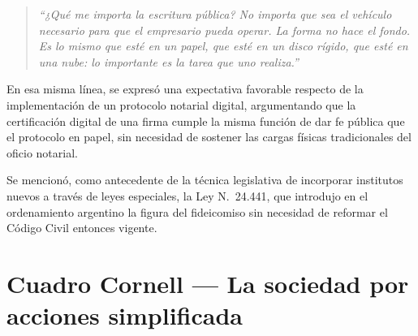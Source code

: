 \documentclass[12pt,oneside]{book}
\begin{document}
\begin{quote}
\textit{``¿Qué me importa la escritura pública? No importa que sea el vehículo necesario para que el empresario pueda operar. La forma no hace el fondo. Es lo mismo que esté en un papel, que esté en un disco rígido, que esté en una nube: lo importante es la tarea que uno realiza.''}
\end{quote}

En esa misma línea, se expresó una expectativa favorable respecto de la implementación de un protocolo notarial digital, argumentando que la certificación digital de una firma cumple la misma función de dar fe pública que el protocolo en papel, sin necesidad de sostener las cargas físicas tradicionales del oficio notarial.

\begin{note}
Se mencionó, como antecedente de la técnica legislativa de incorporar institutos nuevos a través de leyes especiales, la Ley N.\textordmasculine~24.441, que introdujo en el ordenamiento argentino la figura del fideicomiso sin necesidad de reformar el Código Civil entonces vigente.
\end{note}

\section*{Cuadro Cornell — La sociedad por acciones simplificada}
\end{document}
